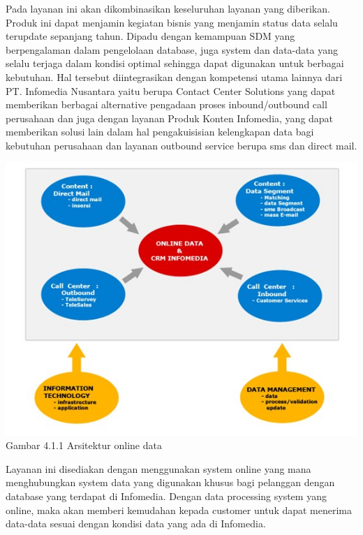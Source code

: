 Pada layanan ini akan dikombinasikan keseluruhan layanan yang diberikan. Produk ini dapat menjamin kegiatan bisnis yang menjamin status data selalu terupdate sepanjang tahun. Dipadu dengan kemampuan SDM yang berpengalaman dalam pengelolaan database, juga system dan data-data yang selalu terjaga dalam kondisi optimal sehingga dapat digunakan untuk berbagai kebutuhan. Hal tersebut diintegrasikan dengan kompetensi utama lainnya dari PT. Infomedia Nusantara yaitu berupa Contact Center Solutions yang dapat memberikan berbagai alternative pengadaan proses inbound/outbound call perusahaan dan juga dengan layanan Produk Konten Infomedia, yang dapat memberikan solusi lain dalam hal pengakuisisian kelengkapan data bagi kebutuhan perusahaan dan layanan outbound service berupa sms dan direct mail.\\
\begin{center}
\includegraphics[scale=1]{gambar411.jpg}\\
Gambar 4.1.1  Arsitektur online data
\end{center} 
Layanan ini disediakan dengan menggunakan system online yang mana menghubungkan system data yang digunakan khusus bagi pelanggan dengan database yang terdapat di Infomedia. Dengan data processing system yang online, maka akan memberi kemudahan kepada customer untuk dapat menerima data-data sesuai dengan kondisi data yang ada di Infomedia.\\
